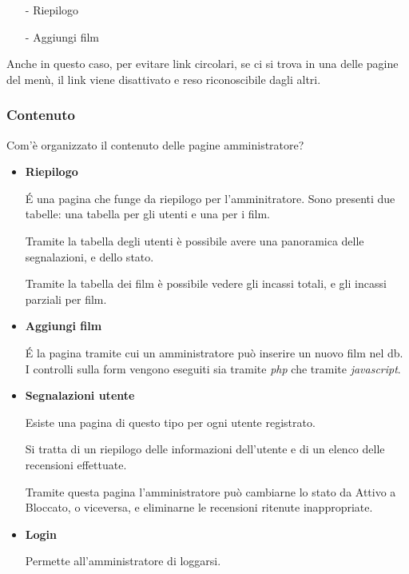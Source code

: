 \documentclass[a4paper]{article}
\begin{document}
\begin{itemize}
    \item[-] Riepilogo
    \item[-] Aggiungi film
\end{itemize}

Anche in questo caso, per evitare link circolari, se ci si trova in una delle pagine del menù, il link viene disattivato e reso riconoscibile dagli altri.

\subsubsection{Contenuto}

Com'è organizzato il contenuto delle pagine amministratore?

\begin{itemize}
    \item \textbf{Riepilogo}
    
    É una pagina che funge da riepilogo per l'amminitratore.
    Sono presenti due tabelle: una tabella per gli utenti e una per i film.

    Tramite la tabella degli utenti è possibile avere una panoramica delle segnalazioni, e dello stato.
    
    Tramite la tabella dei film è possibile vedere gli incassi totali, e gli incassi parziali per film.

    \item \textbf{Aggiungi film}
    
    É la pagina tramite cui un amministratore può inserire un nuovo film nel db. I controlli sulla form vengono eseguiti sia tramite \textit{php} che tramite \textit{javascript}.

    \item \textbf{Segnalazioni utente}
    
    Esiste una pagina di questo tipo per ogni utente registrato.
    
    Si tratta di un riepilogo delle informazioni dell'utente e di un elenco delle recensioni effettuate.

    Tramite questa pagina l'amministratore può cambiarne lo stato da Attivo a Bloccato, o viceversa, e eliminarne le recensioni ritenute inappropriate.

    \item \textbf{Login}
    
    Permette all'amministratore di loggarsi.
    
\end{itemize}
\end{document}
